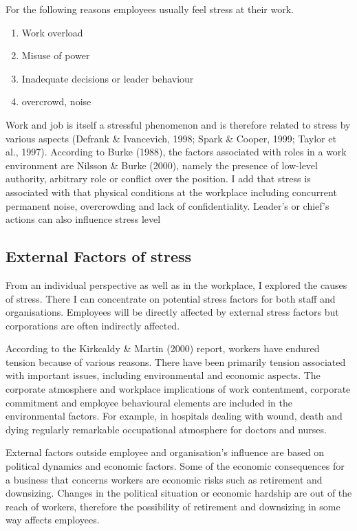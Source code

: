 For the following reasons employees usually feel stress at their work.
\begin{enumerate}
    \item Work overload
    \item Misuse of power
    \item Inadequate decisions or leader behaviour
    \item overcrowd, noise
\end{enumerate}


Work and job is itself a stressful phenomenon and is therefore related to stress by various aspects (Defrank \& Ivancevich, 1998; Spark \& Cooper, 1999; Taylor et al., 1997). According to Burke (1988), the factors associated with roles in a work environment are Nilsson \& Burke (2000), namely the presence of low-level authority, arbitrary role or conflict over the position. I add that stress is associated with that physical conditions at the workplace including concurrent permanent noise, overcrowding and lack of confidentiality. Leader's or chief's actions can also influence stress level \cite[p.9]{Fairbrother2003WorkplaceSatisfaction}

\subsection{External Factors of stress}

From an individual perspective as well as in the workplace, I explored the causes of stress. There I can concentrate on potential stress factors for both staff and organisations. Employees will be directly affected by external stress factors but corporations are often indirectly affected.

According to the Kirkcaldy \& Martin (2000) report, workers have endured tension because of various reasons. There have been primarily tension associated with important issues, including environmental and economic aspects.   The corporate atmosphere and workplace implications of work contentment, corporate commitment and employee behavioural elements are included in the environmental factors.   For example, in hospitals dealing with wound, death and dying regularly remarkable occupational atmosphere for doctors and nurses. \citet[p.10]{Fairbrother2003WorkplaceSatisfaction}

External factors outside employee and organisation's influence are based on political dynamics and economic factors.  Some of the economic consequences for a business that concerns workers are economic risks such as retirement and downsizing. Changes in the political situation or economic hardship are out of the reach of workers, therefore the possibility of retirement and downsizing in some way affects employees. \cite[p.320]{Bloisi2007ManagementBehaviour}


